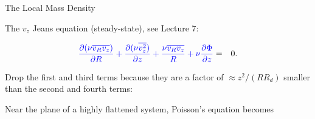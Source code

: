 \documentclass[letterpaper,landscape]{slides}
\begin{document}
\begin{slide}
{\begin{minipage}[t]{16cm}
\vskip 0.3in

\end{minipage}}
\vfill 
\end{slide}







\begin{slide}
\begin{center}
{\large \color{red} 
                    The Local Mass Density   }
\end{center}

The $v_z$ Jeans equation (steady-state), see Lecture 7: 

\begin{eqnarray}
\color{blue} {\partial(\nu \overline{v_R v_z}) \over \partial R } + { \partial (\nu \overline{v_z^2})
\over \partial z } + { \nu \overline{v_R v_z} \over R} + \nu { \partial\Phi \over
\partial z} & = & 0. \nonumber
\end{eqnarray}

Drop the first and third terms because they are a factor of $\approx z^2/(RR_d)$
smaller than the second and fourth terms:


Near the plane of a highly flattened system, Poisson's equation becomes



\vfill
\end{slide}
\end{document}
